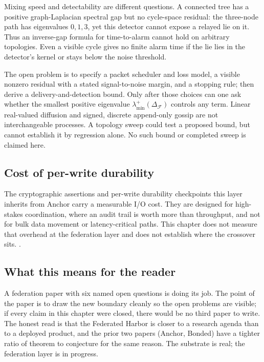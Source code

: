 \documentclass[11pt,a4paper]{article}
\theoremstyle{definition}
\theoremstyle{remark}
\begin{document}
\pdtreecounterexample
Mixing speed and detectability are different questions. A connected tree has a
positive graph-Laplacian spectral gap but no cycle-space residual: the three-node
path has eigenvalues $0,1,3$, yet this detector cannot expose a relayed lie on it.
Thus an inverse-gap formula for time-to-alarm cannot hold on arbitrary topologies.
Even a visible cycle gives no finite alarm time if the lie lies in the detector's
kernel or stays below the noise threshold.

The open problem is to specify a packet scheduler and loss model, a visible
nonzero residual with a stated signal-to-noise margin, and a stopping rule;
then derive a delivery-and-detection bound. Only after those choices can one ask
whether the smallest positive eigenvalue $\lambda_{\min}^{+}
(\Delta_{\mathcal F})$ controls any term. Linear real-valued diffusion and
signed, discrete append-only gossip are not interchangeable processes.
A topology sweep could test a proposed bound, but cannot establish it by
regression alone. No such bound or completed sweep is claimed here.

\subsection{Cost of per-write durability}\label{sec:fh-lim-overhead}

The cryptographic assertions and per-write durability checkpoints this layer inherits from Anchor carry a measurable I/O cost. They are designed for high-stakes coordination, where an audit trail is worth more than throughput, and not for bulk data movement or latency-critical paths. This chapter does not measure that overhead at the federation layer and does not establish where the crossover sits. \Open.

\subsection{What this means for the reader}\label{sec:fh-lim-reader}

A federation paper with six named open questions is doing its job. The point of the paper is to draw the new boundary cleanly so the open problems are visible; if every claim in this chapter were closed, there would be no third paper to write. The honest read is that the Federated Harbor is closer to a research agenda than to a deployed product, and the prior two papers (Anchor, Bonded) have a tighter ratio of theorem to conjecture for the same reason. The substrate is real; the federation layer is in progress.
\end{document}
